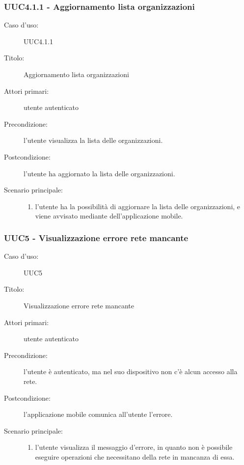 \documentclass[casi-duso]{subfiles}
\begin{document}
\subsubsection{UUC4.1.1 - Aggiornamento lista organizzazioni}%
\label{subsub:UUC4.1.1utente}
\begin{description}
  \item[Caso d’uso:] UUC4.1.1
  \item[Titolo:] Aggiornamento lista organizzazioni
  \item[Attori primari:] utente autenticato
  \item[Precondizione:] l'utente visualizza la lista delle organizzazioni.
  \item[Postcondizione:] l'utente ha aggiornato la lista delle organizzazioni.
  \item[Scenario principale:]
        \begin{enumerate}
          \item l'utente ha la possibilità di aggiornare la lista delle organizzazioni, e viene avvisato mediante  dell'applicazione mobile.
        \end{enumerate}
\end{description}

\subsubsection{UUC5 - Visualizzazione errore rete mancante}%
\label{subsub:UUC5utente}
\begin{description}
  \item[Caso d’uso:] UUC5
  \item[Titolo:] Visualizzazione errore rete mancante
  \item[Attori primari:] utente autenticato
  \item[Precondizione:] l'utente è autenticato, ma nel suo dispositivo non c'è alcun accesso alla rete.
  \item[Postcondizione:] l'applicazione mobile comunica all'utente l'errore.
  \item[Scenario principale:]
        \begin{enumerate}
          \item l'utente visualizza il messaggio d'errore, in quanto non è possibile eseguire operazioni che necessitano della rete in mancanza di essa.
        \end{enumerate}
\end{description}
\end{document}
